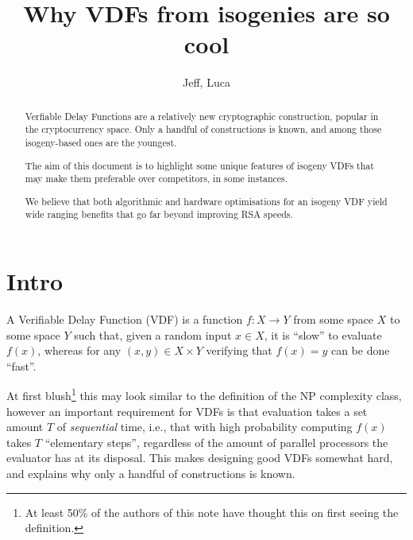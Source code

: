 \documentclass{article}
\title{Why VDFs from isogenies are so cool}
\author{Jeff, Luca}
\date{}
\begin{document}
\maketitle

\begin{abstract}
  Verfiable Delay Functions are a relatively new cryptographic
  construction, popular in the cryptocurrency space. Only a handful of
  constructions is known, and among those isogeny-based ones are the
  youngest.

  The aim of this document is to highlight some unique features of
  isogeny VDFs that may make them preferable over competitors, in some
  instances.

  We believe that both algorithmic and hardware optimisations for an
  isogeny VDF yield wide ranging benefits that go far beyond improving
  RSA speeds.
\end{abstract}

\section{Intro}

A Verifiable Delay Function (VDF) is a function $f:X→Y$ from some
space $X$ to some space $Y$ such that, given a random input $x∈X$, it
is ``slow'' to evaluate $f(x)$, whereas for any $(x,y)∈X×Y$ verifying
that $f(x)=y$ can be done ``fast''.

At first blush\footnote{At least 50\% of the authors of this note have
  thought this on first seeing the definition.} this may look similar
to the definition of the NP complexity class, however an important
requirement for VDFs is that evaluation takes a set amount $T$ of
\emph{sequential} time, i.e., that with high probability computing
$f(x)$ takes $T$ ``elementary steps'', regardless of the amount of
parallel processors the evaluator has at its disposal. This makes
designing good VDFs somewhat hard, and explains why only a handful of
constructions is known.
\end{document}
